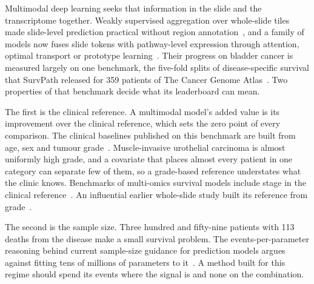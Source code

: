 \documentclass[pdflatex,sn-nature]{sn-jnl}
\begin{document}
Multimodal deep learning seeks that information in the slide and the transcriptome together. Weakly
supervised aggregation over whole-slide tiles made slide-level prediction practical without region
annotation~\citep{lu2021clam, chen2024uni, ding2025titan}, and a family of models now fuses slide
tokens with pathway-level expression through attention, optimal transport or prototype
learning~\citep{chen2021mcat, xu2023motcat, jaume2024survpath, song2024mmp, zhang2024pibd,
eijpe2025dimaf}. Their progress on bladder cancer is measured largely on one benchmark, the five-fold
splits of disease-specific survival that SurvPath released for 359 patients of The Cancer Genome
Atlas~\citep{jaume2024survpath}. Two properties of that benchmark decide what its leaderboard can
mean.

The first is the clinical reference. A multimodal model's added value is its improvement over the
clinical reference, which sets the zero point of every comparison. The clinical baselines published
on this benchmark are built from age, sex and tumour grade~\citep{jaume2024survpath, song2024mmp,
eijpe2025dimaf}. Muscle-invasive urothelial carcinoma is almost uniformly high grade, and a covariate
that places almost every patient in one category can separate few of them, so a grade-based reference
understates what the clinic knows. Benchmarks of multi-omics survival models include stage in the
clinical reference~\citep{herrmann2021benchmark, wissel2023noise, wissel2025survboard}. An
influential earlier whole-slide study built its reference from grade~\citep{chen2022porpoise}.

The second is the sample size. Three hundred and fifty-nine patients with 113 deaths from the
disease make a small survival problem. The events-per-parameter reasoning behind current sample-size
guidance for prediction models argues against fitting tens of millions of parameters to
it~\citep{riley2020samplesize}.
A method built for this regime should spend its events where the signal is and none on the
combination.
\end{document}
